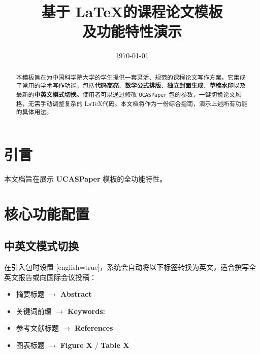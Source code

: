\documentclass[a4paper,12pt]{ctexart}
\title{基于 \LaTeX 的课程论文模板\protect\\ 及功能特性演示}
\date{\today}
\begin{document}
\maketitle

\begin{abstract}
本模板旨在为中国科学院大学的学生提供一套灵活、规范的课程论文写作方案。它集成了常用的学术写作功能，包括\textbf{代码高亮}、\textbf{数学公式排版}、\textbf{独立封面生成}、\textbf{草稿水印}以及最新的\textbf{中英文模式切换}。使用者可以通过修改 \texttt{UCASPaper} 包的参数，一键切换论文风格，无需手动调整复杂的 \LaTeX 代码。本文档将作为一份综合指南，演示上述所有功能的具体用法。

\end{abstract}


\section{引言}
本文档旨在展示 \textbf{UCASPaper} 模板的全功能特性。

\section{核心功能配置}

\subsection{中英文模式切换}
在引入包时设置 [english=true]，系统会自动将以下标签转换为英文，适合撰写全英文报告或向国际会议投稿：
\begin{itemize}
    \item 摘要标题 $\rightarrow$ \textbf{Abstract}
    \item 关键词前缀 $\rightarrow$ \textbf{Keywords:}
    \item 参考文献标题 $\rightarrow$ \textbf{References}
    \item 图表标题 $\rightarrow$ \textbf{Figure X} / \textbf{Table X}
\end{itemize}
\end{document}
